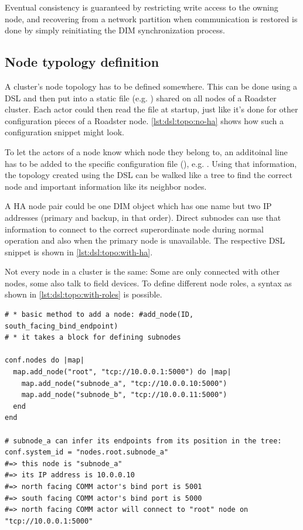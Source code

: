 Eventual consistency is guaranteed by restricting write access to the owning
node, and recovering from a network partition when communication is restored is
done by simply reinitiating the DIM synchronization process.

\subsection{Node typology definition}
A cluster's node topology has to be defined somewhere. This can be done using a
\gls{DSL} and then put into a static file (e.g. ) shared
on all nodes of a Roadster cluster. Each actor could then read the file at
startup, just like it's done for other configuration pieces of a Roadster node.
\autoref{lst:dsl:topo:no-ha} shows how such a configuration snippet might look.

To let the actors of a node know which node they belong to, an additoinal line
has to be added to the specific configuration file (), e.g.
. Using that information, the topology
created using the DSL can be walked like a tree to find the correct node and
important information like its neighbor nodes.

A HA node pair could be one DIM object which has one name but two IP addresses
(primary and backup, in that order). Direct subnodes can use that information
to connect to the correct superordinate node during normal operation and also
when the primary node is unavailable. The respective DSL snippet is shown in
\autoref{lst:dsl:topo:with-ha}.

Not every node in a cluster is the same: Some are only connected with other
nodes, some also talk to field devices. To define different node roles, a
syntax as shown in \autoref{lst:dsl:topo:with-roles} is possible.

\begin{lstlisting}[style=customruby,caption={Cluster DSL example without HA}, label={lst:dsl:topo:no-ha}]
# * basic method to add a node: #add_node(ID, south_facing_bind_endpoint)
# * it takes a block for defining subnodes

conf.nodes do |map|
  map.add_node("root", "tcp://10.0.0.1:5000") do |map|
    map.add_node("subnode_a", "tcp://10.0.0.10:5000")
    map.add_node("subnode_b", "tcp://10.0.0.11:5000")
  end
end

# subnode_a can infer its endpoints from its position in the tree:
conf.system_id = "nodes.root.subnode_a"
#=> this node is "subnode_a"
#=> its IP address is 10.0.0.10
#=> north facing COMM actor's bind port is 5001
#=> south facing COMM actor's bind port is 5000
#=> north facing COMM actor will connect to "root" node on "tcp://10.0.0.1:5000"
\end{lstlisting}

